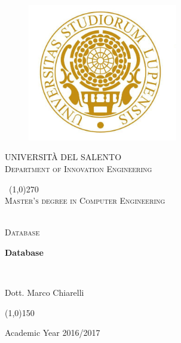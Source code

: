 \documentclass[11 pt,a4paper,twoside,openany]{book}
\begin{document}
\pagestyle{fancy}
\fancyhead{}
\fancyfoot{}
\fancyfoot[R]{\thepage}
\renewcommand{\headrulewidth}{0pt}
\renewcommand{\footrulewidth}{0.1pt}

\newpage	
\begin{titlepage}
\begin{center}
	
\begin{figure}
	\centering
	\includegraphics[height=6cm]{unigold.jpg}
\end{figure}		

\begin{center}
\begin{LARGE}
	\textsc{UNIVERSIT\`A DEL SALENTO}\\
	[0.2cm]
	\textsc{Department of Innovation Engineering}
\end{LARGE}
\end{center}	
	
	\
	\line(1,0){270} \\
	[0.25cm]
	
	\textsc{Master's degree in Computer Engineering}\
	
	\textsl{}\\
	[1cm]
	\textsc{Database}\
	
	\bigskip 
	\huge{\bfseries Database}\

	
	\bigskip
	\textsl{}\\
	[2cm]
	


\begin{LARGE}
	
	Dott. Marco Chiarelli
	
\end{LARGE}

\vspace{5cm}
	
\line(1,0){150} \\
\begin{small}
	Academic Year 2016/2017 \\
\end{small}
\end{center}
\end{titlepage}
\end{document}
